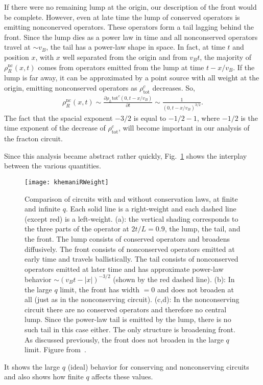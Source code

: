 \documentclass[a4paper,12pt]{article}
\newcommand{\pd}[2]{\frac{\partial #1}{\partial #2}}
\renewcommand{\th}[1]{\frac{1}{#1}}
\newcommand{\abs}[1]{\left| #1 \right|}
\newcommand{\nc}{\text{nc}}
\newcommand{\tot}{\text{tot}}
\begin{document}
If there were no remaining lump at the origin, our description of the front would be complete. However, even at late time the lump of conserved operators is emitting nonconerved operators. These operators form a tail lagging behind the front. Since the lump dies as a power law in time and all nonconserved operators travel at $\sim v_B$, the tail has a power-law shape in space. In fact, at time $t$ and position $x$, with $x$ well separated from the origin and from $v_Bt$, the majority of $\rho^\nc_R(x,t)$ comes from operators emitted from the lump at time $t-x/v_B$. If the lump is far away, it can be approximated by a point source with all weight at the origin, emitting nonconserved operators as $\rho^c_\tot$ decreases. So,
\begin{align}
\rho_R^\nc(x,t)\sim\pd{\rho_L\tot^c(0,t-x/v_B)}{t} \sim\th{(0,t-x/v_B)^{3/2}}.
\end{align}
The fact that the spacial exponent $-3/2$ is equal to $-1/2-1$, where $-1/2$ is the time exponent of the decrease of $\rho_\tot^c$, will become important in our analysis of the fracton circuit.

Since this analysis became abstract rather quickly, Fig.~\ref{fig:khemaniRWeight} shows the interplay between the various quantities. 
\begin{figure}
	\centering
	\texttt{[image: khemaniRWeight]}
	\caption{Comparison of circuits with and without conservation laws, at finite and infinite $q$. Each solid line is a right-weight and each dashed line (except red) is a left-weight. (a): the vertical shading corresponds to the three parts of the operator at $2t/L=0.9$, the lump, the tail, and the front. The lump consists of conserved operators and broadens diffusively. The front consists of nonconserved operators emitted at early time and travels ballistically. The tail consists of nonconserved operators emitted at later time and has approximate power-law behavior $\sim(v_Bt-\abs{x})^{-3/2}$ (shown by the red dashed line). (b): In the large $q$ limit, the front has width $=0$ and does not broaden at all (just as in the nonconserving circuit). (c,d): In the nonconserving circuit there are no conserved operators and therefore no central lump. Since the power-law tail is emitted by the lump, there is no such tail in this case either. The only structure is broadening front. As discussed previously, the front does not broaden in the large $q$ limit. Figure from~\cite{KhemaniOpSp}.}
	\label{fig:khemaniRWeight}
\end{figure}
It shows the large $q$ (ideal) behavior for conserving and nonconserving circuits and also shows how finite $q$ affects these values.
\end{document}
